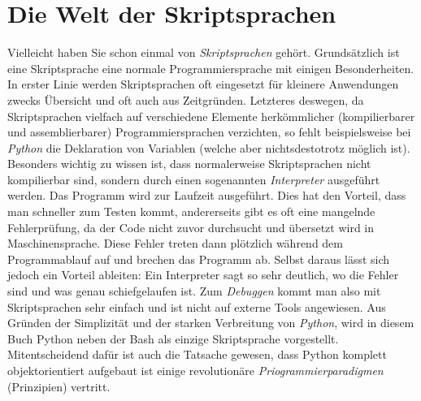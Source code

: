 \documentclass[b5paper,10pt,dvips,fleqn,titlepage,twoside]{book}
\begin{document}
\chapter{Die Welt der Skriptsprachen}
Vielleicht haben Sie schon einmal von \emph{Skriptsprachen} gehört. Grundsätzlich ist eine Skriptsprache eine normale Programmiersprache mit einigen Besonderheiten. In erster Linie werden Skriptsprachen oft eingesetzt für kleinere Anwendungen zwecks Übersicht und oft auch aus Zeitgründen. Letzteres deswegen, da Skriptsprachen vielfach auf verschiedene Elemente herkömmlicher (kompilierbarer und assemblierbarer) Programmiersprachen verzichten, so fehlt beispielsweise bei \emph{Python} die Deklaration von Variablen (welche aber nichtsdestotrotz möglich ist).\newline
Besonders wichtig zu wissen ist, dass normalerweise Skriptsprachen nicht kompilierbar sind, sondern durch einen sogenannten \emph{Interpreter} ausgeführt werden. Das Programm wird zur Laufzeit ausgeführt. Dies hat den Vorteil, dass man schneller zum Testen kommt, andererseits gibt es oft eine mangelnde Fehlerprüfung, da der Code nicht zuvor durchsucht und übersetzt wird in Maschinensprache. Diese Fehler treten dann plötzlich während dem Programmablauf auf und brechen das Programm ab.\newline
Selbst daraus lässt sich jedoch ein Vorteil ableiten: Ein Interpreter sagt so sehr deutlich, wo die Fehler sind und was genau schiefgelaufen ist. Zum \emph{Debuggen} kommt man also mit Skriptsprachen sehr einfach und ist nicht auf externe Tools angewiesen.\newline\newline
Aus Gründen der Simplizität und der starken Verbreitung von \emph{Python}, wird in diesem Buch Python neben der Bash als einzige Skriptsprache vorgestellt. Mitentscheidend dafür ist auch die Tatsache gewesen, dass Python komplett objektorientiert aufgebaut ist einige revolutionäre \emph{Priogrammierparadigmen} (Prinzipien) vertritt.
\end{document}
